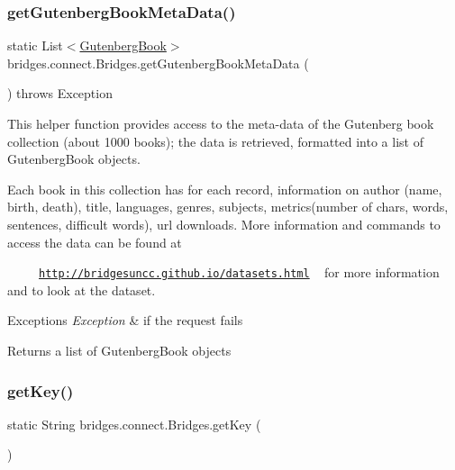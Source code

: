 \subsubsection{\texorpdfstring{get\+Gutenberg\+Book\+Meta\+Data()}{getGutenbergBookMetaData()}}
{\footnotesize\ttfamily static List$<$\mbox{\hyperlink{classbridges_1_1data__src__dependent_1_1_gutenberg_book}{Gutenberg\+Book}}$>$ bridges.\+connect.\+Bridges.\+get\+Gutenberg\+Book\+Meta\+Data (\begin{DoxyParamCaption}{ }\end{DoxyParamCaption}) throws Exception\hspace{0.3cm}{\ttfamily [static]}}

This helper function provides access to the meta-\/data of the Gutenberg book collection (about 1000 books); the data is retrieved, formatted into a list of Gutenberg\+Book objects.

Each book in this collection has for each record, information on author (name, birth, death), title, languages, genres, subjects, metrics(number of chars, words, sentences, difficult words), url downloads. More information and commands to access the data can be found at 

~~~~~\href{http://bridgesuncc.github.io/datasets.html}{\tt http\+://bridgesuncc.\+github.\+io/datasets.\+html} ~\newline
 for more information and to look at the dataset.


\begin{DoxyExceptions}{Exceptions}
{\em Exception} & if the request fails\\
\hline
\end{DoxyExceptions}
\begin{DoxyReturn}{Returns}
a list of Gutenberg\+Book objects 
\end{DoxyReturn}
\mbox{\label{classbridges_1_1connect_1_1_bridges_a426897d6e5449601bb4e20c32b8346f5}} 
\subsubsection{\texorpdfstring{get\+Key()}{getKey()}}
{\footnotesize\ttfamily static String bridges.\+connect.\+Bridges.\+get\+Key (\begin{DoxyParamCaption}{ }\end{DoxyParamCaption})\hspace{0.3cm}{\ttfamily [static]}}

